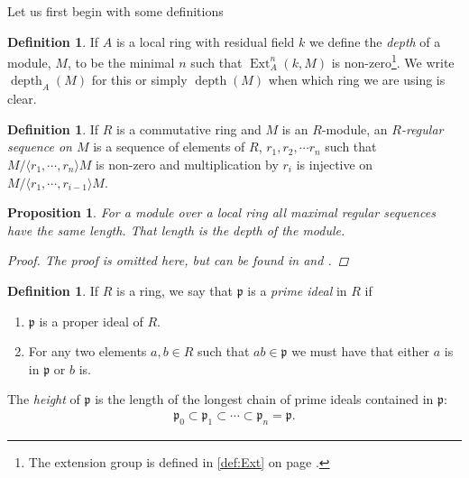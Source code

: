 \documentclass[11pt, a4paper, english]{article}
\newtheorem{prop}[theorem]{Proposition}
\theoremstyle{definition}
\newtheorem{defin}[theorem]{Definition}
\DeclareMathOperator{\Ext}{Ext}
\DeclareMathOperator{\depth}{depth}
\begin{document}
Let us first begin with some definitions
\begin{defin}
If $A$ is a local ring with residual field $k$ we define the \textit{depth} of a module, $M$, to be the minimal $n$ such that $\Ext^n_A(k, M)$ is non-zero\footnote{The extension group is defined in \cref{def:Ext} on page \pageref{def:Ext}.}. We write $\depth_A(M)$ for this or simply $\depth(M)$ when which ring we are using is clear.
\end{defin}

\begin{defin}
\label{def:regular_seq}
If $R$ is a commutative ring and $M$ is an $R$-module, an \textit{$R$-regular sequence on $M$} is a sequence of elements of $R$, $r_1, r_2, \cdots r_n$ such that $M/\langle r_1, \cdots, r_n \rangle M$ is non-zero and multiplication by $r_i$ is injective on $M/\langle r_1, \cdots, r_{i-1} \rangle M$.
\end{defin}

\begin{prop}
For a module over a local ring all maximal regular sequences have the same length. That length is the depth of the module.
\begin{proof}
The proof is omitted here, but can be found in \cite[\href{https://stacks.math.columbia.edu/tag/00LW}{Tag 00LW}]{stacks-project} and \cite[\href{https://stacks.math.columbia.edu/tag/090R}{Tag 090R}]{stacks-project}.
\end{proof}
\end{prop}

\begin{defin}
\label{def:prime_ideal}
If $R$ is a ring, we say that $\mathfrak{p}$ is  a \textit{prime ideal} in $R$ if
\begin{enumerate}
\item $\mathfrak{p}$ is a proper ideal of $R$.
\item For any two elements $a,b \in R$ such that $ab \in \mathfrak{p}$ we must have that either $a$ is in $\mathfrak{p}$ or $b$ is.
\end{enumerate}
The \textit{height} of $\mathfrak{p}$ is the length of the longest chain of prime ideals contained in $\mathfrak{p}$:
\begin{align*}
\mathfrak{p}_0 \subset \mathfrak{p}_1 \subset \cdots \subset \mathfrak{p}_n = \mathfrak{p}.
\end{align*}
\end{defin}
\end{document}
